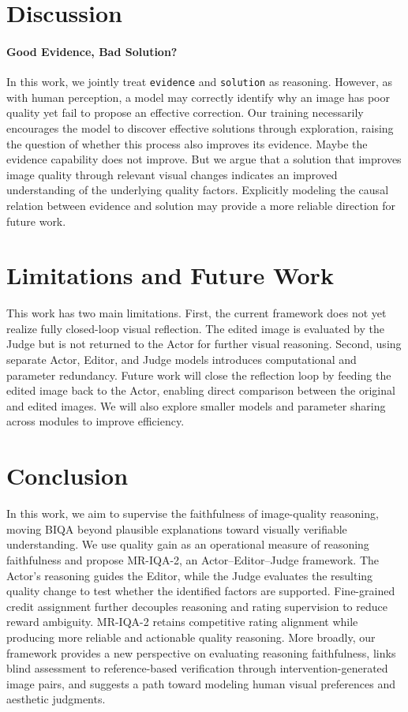 \documentclass[letterpaper]{article} %
\begin{document}
\section{Discussion}
\label{sec:discussion}
\paragraph{Good Evidence, Bad Solution?}
In this work, we jointly treat \texttt{evidence} and \texttt{solution} as reasoning. However, as with human perception, a model may correctly identify why an image has poor quality yet fail to propose an effective correction. Our training necessarily encourages the model to discover effective solutions through exploration, raising the question of whether this process also improves its evidence. Maybe the evidence capability does not improve. But we argue that a solution that improves image quality through relevant visual changes indicates an improved understanding of the underlying quality factors. Explicitly modeling the causal relation between evidence and solution may provide a more reliable direction for future work.


\section{Limitations and Future Work}
\label{sec:limitations}
This work has two main limitations. First, the current framework does not yet
realize fully closed-loop visual reflection. The edited image is evaluated by
the Judge but is not returned to the Actor for further visual reasoning.
Second, using separate Actor, Editor, and Judge models introduces computational
and parameter redundancy.
Future work will close the reflection loop by feeding the edited image back to
the Actor, enabling direct comparison between the original and edited images.
We will also explore smaller models and parameter sharing across modules to
improve efficiency.
\section{Conclusion}
\label{sec:conclusion}
In this work, we aim to supervise the faithfulness of image-quality reasoning,
moving BIQA beyond plausible explanations toward visually verifiable
understanding. We use quality gain as an operational measure of reasoning
faithfulness and propose MR-IQA-2, an Actor--Editor--Judge framework. The
Actor's reasoning guides the Editor, while the Judge evaluates the resulting
quality change to test whether the identified factors are supported.
Fine-grained credit assignment further decouples reasoning and rating
supervision to reduce reward ambiguity. MR-IQA-2 retains competitive rating
alignment while producing more reliable and actionable quality reasoning.
More broadly, our framework provides a new perspective on evaluating reasoning
faithfulness, links blind assessment to reference-based verification through
intervention-generated image pairs, and suggests a path toward modeling human
visual preferences and aesthetic judgments.



\clearpage
\appendix

\end{document}
